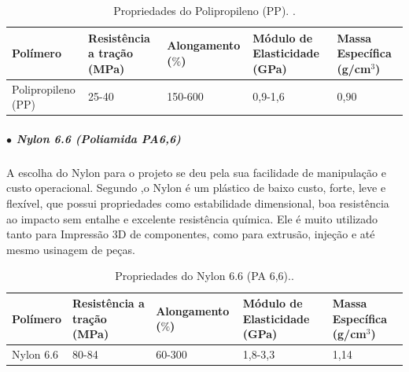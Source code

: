 \begin{table}[H]
    \centering
    \caption{Propriedades do Polipropileno (PP). \cite{mechanicalPolymers}.}
    \label{fig:PropPP}
    \begin{adjustbox}{max width = \textwidth}
        \begin{tabular}{|C{3cm}|C{3cm}|C{2.8cm}|C{3cm}|C{2.5cm}|}
            \hline
            \textbf{Polímero} & \textbf{Resistência a tração (MPa)} & \textbf{Alongamento ($\%$)} & \textbf{Módulo  de Elasticidade (GPa)} & \textbf{Massa Específica (g/cm$^3$)} \\ \hline
            
              Polipropileno (PP) & 25-40 & 150-600 & 0,9-1,6  & 0,90
             \\ \hline
        \end{tabular}
    \end{adjustbox}
\end{table}

\subparagraph*{$\bullet$ Nylon 6.6 (Poliamida PA6,6)} \hfill

A escolha do Nylon para o projeto se deu pela sua facilidade de manipulação e custo operacional. Segundo \cite{Imp3D_Polimeros},o Nylon é um plástico de baixo custo, forte, leve e flexível, que possui propriedades como estabilidade dimensional, boa resistência ao impacto sem entalhe e excelente resistência química. Ele é muito utilizado tanto para Impressão 3D de componentes, como para extrusão, injeção e até mesmo usinagem de peças.

\begin{table}[H]
    \centering
    \caption{Propriedades do Nylon 6.6 (PA 6,6).\cite{mechanicalPolymers}.}
    \label{tab:PropPA6}
    \begin{adjustbox}{max width = \textwidth}
        \begin{tabular}{|C{2cm}|C{3cm}|C{3cm}|C{3cm}|C{2.5cm}|}
            \hline
            \textbf{Polímero} & \textbf{Resistência a tração (MPa)} & \textbf{Alongamento ($\%$) } & \textbf{Módulo de Elasticidade (GPa)} & \textbf{Massa Específica (g/cm$^3$)} \\ \hline
            
              Nylon 6.6 & 80-84 & 60-300 & 1,8-3,3 & 1,14
             \\ \hline
        \end{tabular}
    \end{adjustbox}
\end{table}


